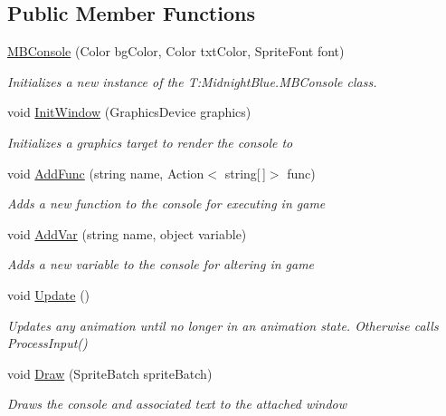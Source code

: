\subsection*{Public Member Functions}
\begin{DoxyCompactItemize}
\item 
\hyperlink{class_m_b2_d_1_1_m_b_console_a9d251b5f9babfcb08cc519d707c9b815}{M\+B\+Console} (Color bg\+Color, Color txt\+Color, Sprite\+Font font)
\begin{DoxyCompactList}\small\item\em Initializes a new instance of the T\+:\+Midnight\+Blue.\+M\+B\+Console class. \end{DoxyCompactList}\item 
void \hyperlink{class_m_b2_d_1_1_m_b_console_a745ef1f55523b29b83d4d94c1fe5400b}{Init\+Window} (Graphics\+Device graphics)
\begin{DoxyCompactList}\small\item\em Initializes a graphics target to render the console to \end{DoxyCompactList}\item 
void \hyperlink{class_m_b2_d_1_1_m_b_console_a3c515ad4a199b0b67049df57fce7cb3f}{Add\+Func} (string name, Action$<$ string\mbox{[}$\,$\mbox{]}$>$ func)
\begin{DoxyCompactList}\small\item\em Adds a new function to the console for executing in game \end{DoxyCompactList}\item 
void \hyperlink{class_m_b2_d_1_1_m_b_console_aeff7888e763a415aeccadc347e09828d}{Add\+Var} (string name, object variable)
\begin{DoxyCompactList}\small\item\em Adds a new variable to the console for altering in game \end{DoxyCompactList}\item 
void \hyperlink{class_m_b2_d_1_1_m_b_console_a4239aee536dc49bbbd59d81d79f24266}{Update} ()
\begin{DoxyCompactList}\small\item\em Updates any animation until no longer in an animation state. Otherwise calls Process\+Input() \end{DoxyCompactList}\item 
void \hyperlink{class_m_b2_d_1_1_m_b_console_ab737469f6fe24b287f7979f788adb8c9}{Draw} (Sprite\+Batch sprite\+Batch)
\begin{DoxyCompactList}\small\item\em Draws the console and associated text to the attached window \end{DoxyCompactList}\item 

\end{DoxyCompactItemize}

